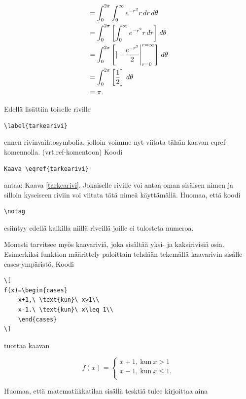 \documentclass[a4paper,12 pt]{article}
\theoremstyle{plain}
\theoremstyle{definition}
\theoremstyle{remark}
\numberwithin{equation}{section}
\numberwithin{figure}{section}
\begin{document}
\begin{align}
&=\int_0^{2\pi} \int_0^\infty
  e^{-r^2} r\,dr\,d\theta\notag
\\
&=\int_0^{2\pi}\left[ \int_0^\infty
  e^{-r^2}r\,dr\right] \,d\theta\label{tarkearivi}
\\
&=\int_0^{2\pi} \left[] \left. -\frac{e^{-r^2}}2
  \right|_{r=0}^{r=\infty} \right] \,d\theta\notag
\\
&=\int_0^{2\pi} \left[\frac12\right]\,d\theta\notag
\\
&=\pi.
\end{align}

Edellä lisättiin toiselle riville 

\begin{verbatim}
\label{tarkearivi}
\end{verbatim}
ennen rivinvaihtosymbolia, jolloin voimme nyt viitata tähän kaavan  eqref-komennolla. (vrt.ref-komentoon) Koodi

\begin{verbatim}
Kaava \eqref{tarkearivi}
\end{verbatim}
antaa: Kaava \eqref{tarkearivi}. Jokaiselle riville voi antaa oman sisäisen nimen ja silloin kyseiseen riviin voi viitata tätä nimeä käyttämällä. Huomaa, että koodi

\begin{verbatim}
\notag
\end{verbatim}
esiintyy edellä kaikilla niillä riveillä joille ei tulosteta numeroa.

Monesti tarvitsee myös kaavariviä, joka sisältää yksi- ja kaksirivisiä osia. Esimerkiksi funktion määrittely paloittain tehdään tekemällä kaavarivin sisälle cases-ympäristö. Koodi 

\begin{verbatim}
\[
f(x)=\begin{cases}
    x+1,\ \text{kun}\ x>1\\
    x-1.\ \text{kun}\ x\leq 1\\
    \end{cases}
\]
\end{verbatim}
tuottaa kaavan

\[
f(x)=\begin{cases}
    x+1,\ \text{kun}\ x>1\\
    x-1,\ \text{kun}\ x\leq 1.\\
    \end{cases}
\]

\noindent Huomaa, että matematiikkatilan sisällä tesktiä tulee kirjoittaa aina 
\end{document}
